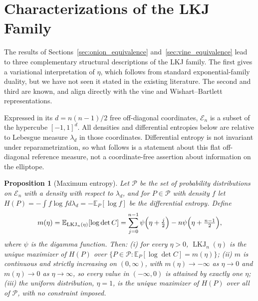 \documentclass[12pt,english]{article}
\theoremstyle{plain} %
\newtheorem{proposition}{Proposition}
\theoremstyle{definition} %
\theoremstyle{remark} %
\begin{document}
\section{Characterizations of the LKJ Family}
\label{sec:characterizations}

The results of Sections~\ref{sec:onion_equivalence} and~\ref{sec:vine_equivalence} lead to three complementary structural descriptions of the LKJ family. The first gives a variational interpretation of $\eta$, which follows from standard exponential-family duality, but we have not seen it stated in the existing literature. The second and third are known, and align directly with the vine and Wishart--Bartlett representations.

Expressed in its $d=n(n-1)/2$ free off-diagonal coordinates, $\mathcal{E}_n$ is a subset of the hypercube $[-1,1]^d$. All densities and differential entropies below are relative to Lebesgue measure $\lambda_d$ in those coordinates. Differential entropy is not invariant under reparametrization, so what follows is a statement about this flat off-diagonal reference measure, not a coordinate-free assertion about information on the elliptope.

\begin{proposition}[Maximum entropy]
\label{prop:maxent}
Let $\mathcal{P}$ be the set of probability distributions on $\mathcal{E}_n$ with a density with respect to $\lambda_d$, and for $P\in\mathcal{P}$ with density $f$ let $H(P)=-\int f\log fd\lambda_d=-\mathbb{E}_P[\log f]$ be the differential entropy. Define
$$
m(\eta)=\mathbb{E}_{\operatorname{LKJ}_n(\eta)}[\log\det C]
=\sum_{j=0}^{n-1}\psi\Bigl(\eta+\tfrac{j}{2}\Bigr)-n\psi\Bigl(\eta+\tfrac{n-1}{2}\Bigr),
$$
where $\psi$ is the digamma function. Then:
(i) for every $\eta>0$, $\operatorname{LKJ}_n(\eta)$ is the unique maximizer of $H(P)$ over $\{P\in\mathcal{P}:\mathbb{E}_P[\log\det C]=m(\eta)\}$;
(ii) $m$ is continuous and strictly increasing on $(0,\infty)$, with $m(\eta)\rightarrow-\infty$ as $\eta\rightarrow0$ and $m(\eta)\rightarrow0$ as $\eta\rightarrow\infty$, so every value in $(-\infty,0)$ is attained by exactly one $\eta$;
(iii) the uniform distribution, $\eta=1$, is the unique maximizer of $H(P)$ over all of $\mathcal{P}$, with no constraint imposed.
\end{proposition}
\end{document}
